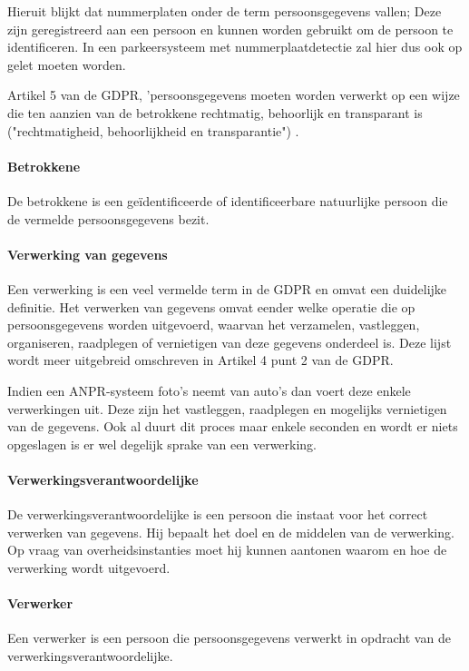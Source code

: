 Hieruit blijkt dat nummerplaten onder de term persoonsgegevens vallen; Deze zijn geregistreerd aan een persoon en kunnen worden gebruikt om de persoon te identificeren. In een parkeersysteem met nummerplaatdetectie zal hier dus ook op gelet moeten worden. 

Artikel 5 van de GDPR, 'persoonsgegevens moeten worden verwerkt op een wijze die ten aanzien van de betrokkene rechtmatig, behoorlijk en transparant is ("rechtmatigheid, behoorlijkheid en transparantie") \autocite{avg2018privacy}.

\paragraph{Betrokkene}
De betrokkene is een geïdentificeerde of identificeerbare natuurlijke persoon die de vermelde persoonsgegevens bezit.

\paragraph{Verwerking van gegevens}
Een verwerking is een veel vermelde term in de GDPR en omvat een duidelijke definitie. Het verwerken van gegevens omvat eender welke operatie die op persoonsgegevens worden uitgevoerd, waarvan het verzamelen, vastleggen, organiseren, raadplegen of vernietigen van deze gegevens onderdeel is. Deze lijst wordt meer uitgebreid omschreven in Artikel 4 punt 2 van de GDPR.

Indien een ANPR-systeem foto's neemt van auto's dan voert deze enkele verwerkingen uit. Deze zijn het vastleggen, raadplegen en mogelijks vernietigen van de gegevens. Ook al duurt dit proces maar enkele seconden en wordt er niets opgeslagen is er wel degelijk sprake van een verwerking.

\paragraph{Verwerkingsverantwoordelijke}
De verwerkingsverantwoordelijke is een persoon die instaat voor het correct verwerken van gegevens. Hij bepaalt het doel en de middelen van de verwerking. Op vraag van overheidsinstanties moet hij kunnen aantonen waarom en hoe de verwerking wordt uitgevoerd.

\paragraph{Verwerker}
Een verwerker is een persoon die persoonsgegevens verwerkt in opdracht van de verwerkingsverantwoordelijke.

